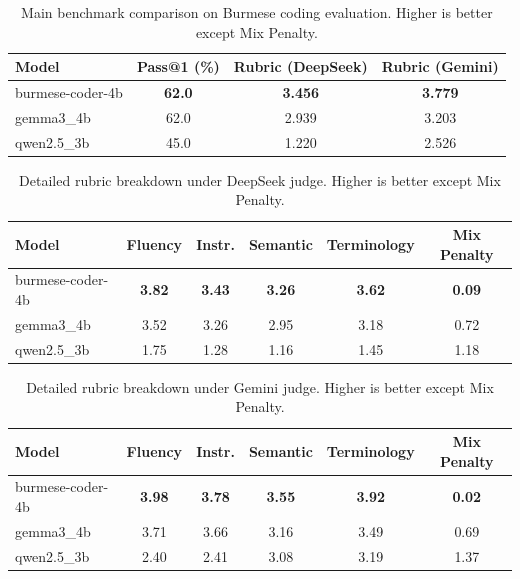 \documentclass[11pt]{article}
\begin{document}
\begin{table}[t]
\centering
\small
\caption{Main benchmark comparison on Burmese coding evaluation. Higher is better except Mix Penalty.}
\label{tab:main_results}
\begin{tabular}{lccc}
\toprule
Model & Pass@1 (\%) & Rubric (DeepSeek) & Rubric (Gemini) \\
\midrule
burmese-coder-4b & \textbf{62.0} & \textbf{3.456} & \textbf{3.779} \\
gemma3\_4b       & 62.0          & 2.939          & 3.203 \\
qwen2.5\_3b      & 45.0          & 1.220          & 2.526 \\
\bottomrule
\end{tabular}
\end{table}

\begin{table}[t]
\centering
\small
\caption{Detailed rubric breakdown under DeepSeek judge. Higher is better except Mix Penalty.}
\label{tab:deepseek_breakdown}
\begin{tabular}{lccccc}
\toprule
Model & Fluency & Instr. & Semantic & Terminology & Mix Penalty \\
\midrule
burmese-coder-4b & \textbf{3.82} & \textbf{3.43} & \textbf{3.26} & \textbf{3.62} & \textbf{0.09} \\
gemma3\_4b       & 3.52          & 3.26          & 2.95          & 3.18          & 0.72 \\
qwen2.5\_3b      & 1.75          & 1.28          & 1.16          & 1.45          & 1.18 \\
\bottomrule
\end{tabular}
\end{table}

\begin{table}[t]
\centering
\small
\caption{Detailed rubric breakdown under Gemini judge. Higher is better except Mix Penalty.}
\label{tab:gemini_breakdown}
\begin{tabular}{lccccc}
\toprule
Model & Fluency & Instr. & Semantic & Terminology & Mix Penalty \\
\midrule
burmese-coder-4b & \textbf{3.98} & \textbf{3.78} & \textbf{3.55} & \textbf{3.92} & \textbf{0.02} \\
gemma3\_4b       & 3.71          & 3.66          & 3.16          & 3.49          & 0.69 \\
qwen2.5\_3b      & 2.40          & 2.41          & 3.08          & 3.19          & 1.37 \\
\bottomrule
\end{tabular}
\end{table}
\end{document}
